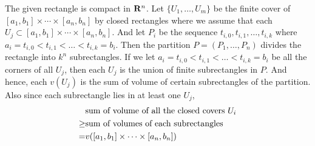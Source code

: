 \begin{solution}
    The given rectangle is compact in $\mathbf{R}^n$.
    Let $\{U_1,\ldots,U_m\}$ be the finite
    cover of $[a_1,b_1]\times\cdots\times
    [a_n,b_n]$ by closed rectangles where we
    assume that each $U_j\subset 
    [a_1,b_1]\times\cdots\times [a_n,b_n]$.
    And let $P_i$ be the sequence $t_{i,0},
    t_{i,1},\ldots,t_{i,k}$ where $a_i=
    t_{i,0}<t_{i,1}<\ldots<t_{i,k}=b_i$.
    Then the partition $P=(P_1,\ldots,P_n)$
    divides the rectangle into $k^n$
    subrectangles. If we let $a_i=
    t_{i,0}<t_{i,1}<\ldots<t_{i,k}=b_i$
    be all the
    corners of all $U_j$, then each $U_j$ is
    the union of finite subrectangles in $P$.
    And hence, each $v(U_j)
    $ is the sum of volume of certain
    subrectangles of the partition.
    Also since each subrectangle lies in at
    least one $U_j$,
    \begin{align*}
        &\textnormal{sum
    of volume of all the closed covers
    $U_i$}\\
    \ge&\textnormal{sum of volumes of each
    subrectangles}\\
    =&v([a_1,b_1]\times\cdots\times
    [a_n,b_n])
    \end{align*}

\end{solution}